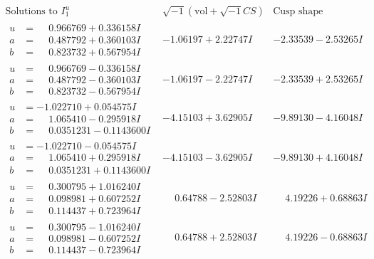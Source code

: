 \documentclass[1p]{elsarticle_modified}
\theoremstyle{definition}
\newcommand{\I}{\sqrt{-1}}
\begin{document}
$$\begin{array}{c|c|c}  
\text{Solutions to }I^u_{1}& \I (\text{vol} + \sqrt{-1}CS) & \text{Cusp shape}\\
 \hline 
\begin{aligned}
u &= \phantom{-}0.966769 + 0.336158 I \\
a &= \phantom{-}0.487792 + 0.360103 I \\
b &= \phantom{-}0.823732 + 0.567954 I\end{aligned}
 & -1.06197 + 2.22747 I & -2.33539 - 2.53265 I \\ \hline\begin{aligned}
u &= \phantom{-}0.966769 - 0.336158 I \\
a &= \phantom{-}0.487792 - 0.360103 I \\
b &= \phantom{-}0.823732 - 0.567954 I\end{aligned}
 & -1.06197 - 2.22747 I & -2.33539 + 2.53265 I \\ \hline\begin{aligned}
u &= -1.022710 + 0.054575 I \\
a &= \phantom{-}1.065410 - 0.295918 I \\
b &= \phantom{-}0.0351231 - 0.1143600 I\end{aligned}
 & -4.15103 + 3.62905 I & -9.89130 - 4.16048 I \\ \hline\begin{aligned}
u &= -1.022710 - 0.054575 I \\
a &= \phantom{-}1.065410 + 0.295918 I \\
b &= \phantom{-}0.0351231 + 0.1143600 I\end{aligned}
 & -4.15103 - 3.62905 I & -9.89130 + 4.16048 I \\ \hline\begin{aligned}
u &= \phantom{-}0.300795 + 1.016240 I \\
a &= \phantom{-}0.098981 + 0.607252 I \\
b &= \phantom{-}0.114437 + 0.723964 I\end{aligned}
 & \phantom{-}0.64788 - 2.52803 I & \phantom{-}4.19226 + 0.68863 I \\ \hline\begin{aligned}
u &= \phantom{-}0.300795 - 1.016240 I \\
a &= \phantom{-}0.098981 - 0.607252 I \\
b &= \phantom{-}0.114437 - 0.723964 I\end{aligned}
 & \phantom{-}0.64788 + 2.52803 I & \phantom{-}4.19226 - 0.68863 I \\ \hline\begin{aligned}

\end{aligned}
\end{array}$$
\end{document}
